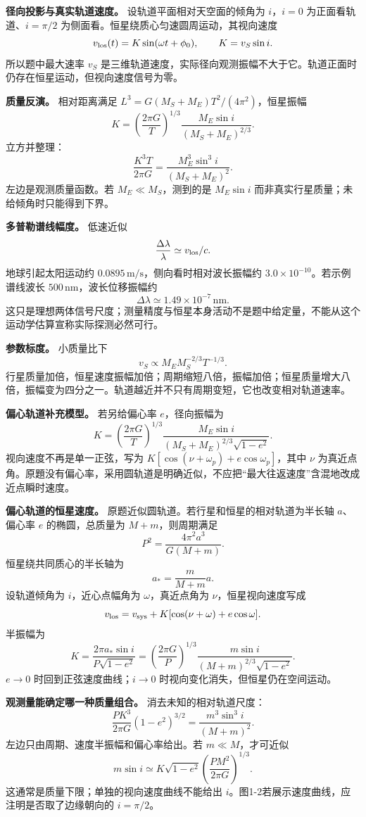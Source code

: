 \documentclass[12pt,a4paper,UTF8]{ctexart}
\begin{document}
\textbf{径向投影与真实轨道速度。} 设轨道平面相对天空面的倾角为
\(i\)，\(i=0\) 为正面看轨道、\(i=\pi/2\)
为侧面看。恒星绕质心匀速圆周运动，其视向速度 \[
v_{\rm los}(t)=K\sin(\omega t+\phi_0),\qquad
K=v_S\sin i.
\] 所以题中最大速率 \(v_S\)
是三维轨道速度，实际径向观测振幅不大于它。轨道正面时仍存在恒星运动，但视向速度信号为零。

\textbf{质量反演。} 相对距离满足
\(L^3=G(M_S+M_E)T^2/(4\pi^2)\)，恒星振幅 \[
K=\left(\frac{2\pi G}{T}\right)^{1/3}
\frac{M_E\sin i}{(M_S+M_E)^{2/3}}.
\] 立方并整理： \[
\boxed{\frac{K^3T}{2\pi G}=
\frac{M_E^3\sin^3i}{(M_S+M_E)^2}}.
\] 左边是观测质量函数。若 \(M_E\ll M_S\)，测到的是 \(M_E\sin i\)
而非真实行星质量；未给倾角时只能得到下界。

\textbf{多普勒谱线幅度。} 低速近似 \[
\frac{\Delta\lambda}{\lambda}\simeq v_{\rm los}/c.
\] 地球引起太阳运动约 \(0.0895\,\mathrm{m/s}\)，侧向看时相对波长振幅约
\(3.0\times10^{-10}\)。若示例谱线波长
\(500\,\mathrm{nm}\)，波长位移振幅约 \[
\Delta\lambda\simeq1.49\times10^{-7}\,\mathrm{nm}.
\]
这只是理想两体信号尺度；测量精度与恒星本身活动不是题中给定量，不能从这个运动学估算宣称实际探测必然可行。

\textbf{参数标度。} 小质量比下 \[
v_S\propto M_E M_S^{-2/3}T^{-1/3}.
\]
行星质量加倍，恒星速度振幅加倍；周期缩短八倍，振幅加倍；恒星质量增大八倍，振幅变为四分之一。轨道越近并不只有周期变短，它也改变相对轨道速率。

\textbf{偏心轨道补充模型。} 若另给偏心率 \(e\)，径向振幅为 \[
K=\left(\frac{2\pi G}{T}\right)^{1/3}
\frac{M_E\sin i}{(M_S+M_E)^{2/3}\sqrt{1-e^2}}.
\] 视向速度不再是单一正弦，写为
\(K[\cos(\nu+\omega_p)+e\cos\omega_p]\)，其中 \(\nu\)
为真近点角。原題没有偏心率，采用圆轨道是明确近似，不应把``最大往返速度''含混地改成近点瞬时速度。

\textbf{偏心轨道的恒星速度。}
原题近似圆轨道。若行星和恒星的相对轨道为半长轴 \(a\)、偏心率 \(e\)
的椭圆，总质量为 \(M+m\)，则周期满足 \[
P^2=\frac{4\pi^2a^3}{G(M+m)}.
\] 恒星绕共同质心的半长轴为 \[
a_*=\frac{m}{M+m}a.
\] 设轨道倾角为 \(i\)，近心点幅角为 \(\omega\)，真近点角为
\(\nu\)，恒星视向速度写成 \[
v_{\rm los}=v_{\rm sys}
+K[\cos(\nu+\omega)+e\cos\omega].
\] 半振幅为 \[
K=\frac{2\pi a_*\sin i}{P\sqrt{1-e^2}}
=\left(\frac{2\pi G}{P}\right)^{1/3}
\frac{m\sin i}{(M+m)^{2/3}\sqrt{1-e^2}}.
\] \(e\to0\) 时回到正弦速度曲线；\(i\to0\)
时视向变化消失，但恒星仍在空间运动。

\textbf{观测量能确定哪一种质量组合。} 消去未知的相对轨道尺度： \[
\boxed{\frac{PK^3}{2\pi G}(1-e^2)^{3/2}
=\frac{m^3\sin^3i}{(M+m)^2}}.
\] 左边只由周期、速度半振幅和偏心率给出。若 \(m\ll M\)，才可近似 \[
m\sin i\simeq
K\sqrt{1-e^2}\left(\frac{PM^2}{2\pi G}\right)^{1/3}.
\] 这通常是质量下限；单独的视向速度曲线不能给出
\(i\)。图1-2若展示速度曲线，应注明是否取了边缘朝向的 \(i=\pi/2\)。
\end{document}
